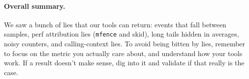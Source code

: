 


\paragraph{Overall summary.} We saw a bunch of lies that our tools can return: events that fall between samples, perf attribution lies (\texttt{mfence} and skid), long tails hidden in averages, noisy counters, and calling-context lies. To avoid being bitten by lies, remember to focus on the metric you actually care about,
and understand how your tools work. If a result doesn't make sense, dig into it and validate if that really is the case.




